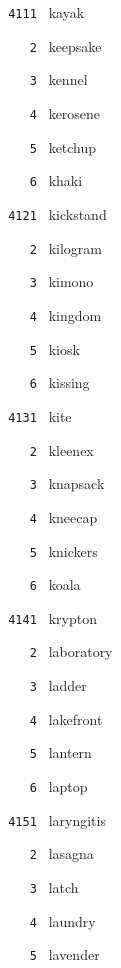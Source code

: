 \documentclass[11pt]{article}
\begin{document}
\begin{multicols}{6}
\small
\noindent \texttt{ 4111 } kayak  \par
\noindent \texttt{ \ \ \ 2 } keepsake  \par
\noindent \texttt{ \ \ \ 3 } kennel  \par
\noindent \texttt{ \ \ \ 4 } kerosene  \par
\noindent \texttt{ \ \ \ 5 } ketchup  \par
\noindent \texttt{ \ \ \ 6 } khaki  \par
\vspace{3mm}
\noindent \texttt{ 4121 } kickstand  \par
\noindent \texttt{ \ \ \ 2 } kilogram  \par
\noindent \texttt{ \ \ \ 3 } kimono  \par
\noindent \texttt{ \ \ \ 4 } kingdom  \par
\noindent \texttt{ \ \ \ 5 } kiosk  \par
\noindent \texttt{ \ \ \ 6 } kissing  \par
\vspace{3mm}
\noindent \texttt{ 4131 } kite  \par
\noindent \texttt{ \ \ \ 2 } kleenex  \par
\noindent \texttt{ \ \ \ 3 } knapsack  \par
\noindent \texttt{ \ \ \ 4 } kneecap  \par
\noindent \texttt{ \ \ \ 5 } knickers  \par
\noindent \texttt{ \ \ \ 6 } koala  \par
\vspace{3mm}
\noindent \texttt{ 4141 } krypton  \par
\noindent \texttt{ \ \ \ 2 } laboratory  \par
\noindent \texttt{ \ \ \ 3 } ladder  \par
\noindent \texttt{ \ \ \ 4 } lakefront  \par
\noindent \texttt{ \ \ \ 5 } lantern  \par
\noindent \texttt{ \ \ \ 6 } laptop  \par
\vspace{3mm}
\noindent \texttt{ 4151 } laryngitis  \par
\noindent \texttt{ \ \ \ 2 } lasagna  \par
\noindent \texttt{ \ \ \ 3 } latch  \par
\noindent \texttt{ \ \ \ 4 } laundry  \par
\noindent \texttt{ \ \ \ 5 } lavender  \par

\end{multicols}
\end{document}
